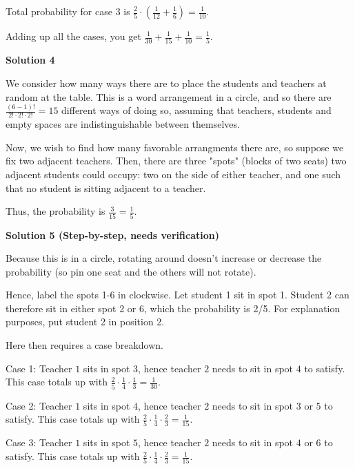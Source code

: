 \begin{enumerate}
 Total probability for case $3$ is $\frac{2}{5}\cdot (\frac{1}{12} + \frac{1}{6}) = \frac{1}{10}$.

 
Adding up all the cases, you get $\frac{1}{30} + \frac{1}{15} + \frac{1}{10} = \boxed{\frac{1}{5}}$.

 



\textbf{Solution 4}

We consider how many ways there are to place the students and teachers at random at the table. This is a word arrangement in a circle, and so there are $\frac{(6-1)!}{2! \cdot 2!\cdot 2!}=15$ different ways of doing so, assuming that teachers, students and empty spaces are indistinguishable between themselves. 

 Now, we wish to find how many favorable arrangments there are, so suppose we fix two adjacent teachers. Then, there are three "spots" (blocks of two seats) two adjacent students could occupy: two on the side of either teacher, and one such that no student is sitting adjacent to a teacher.

 Thus, the probability is $\frac{3}{15}=\boxed{\frac{1}{5}}$.

 



\textbf{Solution 5 (Step-by-step, needs verification)}

Because this is in a circle, rotating around doesn't increase or decrease the probability (so pin one seat and the others will not rotate).

 Hence, label the spots 1-6 in clockwise. Let student 1 sit in spot 1. Student 2 can therefore sit in either spot 2 or 6, which the probability is 2/5. For explanation purposes, put student 2 in position 2. 

 Here then requires a case breakdown. 

 Case 1: Teacher $1$ sits in spot $3$, hence teacher $2$ needs to sit in spot $4$ to satisfy. This case totals up with $\frac{2}{5}\cdot \frac{1}{4} \cdot \frac{1}{3} = \frac{1}{30}$.

 Case 2: Teacher $1$ sits in spot $4$, hence teacher $2$ needs to sit in spot $3$ or $5$ to satisfy. This case totals up with $\frac{2}{5} \cdot \frac{1}{4} \cdot \frac{2}{3} = \frac{1}{15}$.

 Case 3: Teacher $1$ sits in spot $5$, hence teacher $2$ needs to sit in spot $4$ or $6$ to satisfy. This case totals up with $\frac{2}{5} \cdot \frac{1}{4} \cdot \frac{2}{3} = \frac{1}{15}$.


\end{enumerate}
